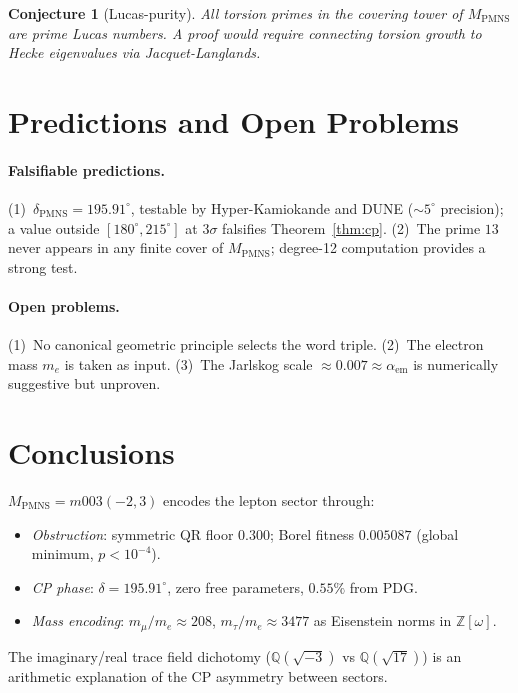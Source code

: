 \documentclass[11pt,a4paper]{article}
\newtheorem{conjecture}[theorem]{Conjecture}
\theoremstyle{definition}
\newcommand{\MPMNS}{M_{\mathrm{PMNS}}}
\newcommand{\Zom}{\mathbb{Z}[\omega]}
\begin{document}
\begin{conjecture}[Lucas-purity]
All torsion primes in the covering tower of $\MPMNS$ are prime
Lucas numbers. A proof would require connecting torsion growth to
Hecke eigenvalues via Jacquet-Langlands.
\end{conjecture}

\section{Predictions and Open Problems}
\label{sec:predictions}

\paragraph{Falsifiable predictions.}
(1)~$\delta_{\mathrm{PMNS}}=195.91^\circ$, testable by
Hyper-Kamiokande and DUNE (${\sim}5^\circ$ precision);
a value outside $[180^\circ,215^\circ]$ at $3\sigma$
falsifies Theorem~\ref{thm:cp}.
(2)~The prime $13$ never appears in any finite cover of $\MPMNS$;
degree-12 computation provides a strong test.

\paragraph{Open problems.}
(1)~No canonical geometric principle selects the word triple.
(2)~The electron mass $m_e$ is taken as input.
(3)~The Jarlskog scale $\approx0.007\approx\alpha_{\mathrm{em}}$
is numerically suggestive but unproven.

\section{Conclusions}
\label{sec:conclusions}

$\MPMNS=m003(-2,3)$ encodes the lepton sector through:
\begin{itemize}
\item \emph{Obstruction}: symmetric QR floor $0.300$;
  Borel fitness $0.005087$ (global minimum, $p<10^{-4}$).
\item \emph{CP phase}: $\delta=195.91^\circ$,
  zero free parameters, $0.55\%$ from PDG.
\item \emph{Mass encoding}: $m_\mu/m_e\approx208$,
  $m_\tau/m_e\approx3477$ as Eisenstein norms in $\Zom$.
\end{itemize}
The imaginary/real trace field dichotomy
($\mathbb{Q}(\sqrt{-3})$ vs $\mathbb{Q}(\sqrt{17})$)
is an arithmetic explanation of the CP asymmetry between sectors.
\end{document}

